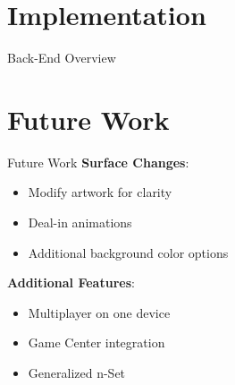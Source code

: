 \documentclass{beamer}
\begin{document}
\section{Implementation}
\begin{frame}[t]{Back-End Overview}
 
\end{frame}

\section{Future Work}
\begin{frame}[t]{Future Work}
 \textbf{Surface Changes}:
\begin{itemize}
 \item Modify artwork for clarity
 \item Deal-in animations
 \item Additional background color options
\end{itemize}

\pause
\vspace{.5cm}

 \textbf{Additional Features}:
\begin{itemize}
 \item Multiplayer on one device
 \item Game Center integration
 \item Generalized n-Set
\end{itemize}
\end{frame}
\end{document}
